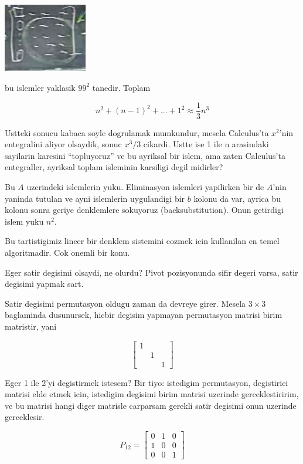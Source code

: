 \documentclass[12pt,fleqn]{article}\usepackage{../common}
\begin{document}
\includegraphics[height=3cm]{02.png}

bu islemler yaklasik $99^2$ tanedir. Toplam

\[ n^2 + (n-1)^2 + ... + 1^2 \approx \frac{ 1}{3} n^3 \]

Ustteki sonucu kabaca soyle dogrulamak mumkundur, mesela Calculus'ta
$x^2$'nin entegralini aliyor olsaydik, sonuc $x^3/3$
cikardi. Ustte ise 1 ile n arasindaki sayilarin karesini ``topluyoruz'' ve
bu ayriksal bir islem, ama zaten Calculus'ta entegraller, ayriksal toplam
isleminin karsiligi degil midirler? 

Bu $A$ uzerindeki islemlerin yuku. Eliminasyon islemleri yapilirken bir de
$A$'nin yaninda tutulan ve ayni islemlerin uygulandigi bir $b$ kolonu da
var, ayrica bu kolonu sonra geriye denklemlere sokuyoruz
(backsubstitution). Onun getirdigi islem yuku $n^2$.

Bu tartistigimiz lineer bir denklem sistemini cozmek icin kullanilan en
temel algoritmadir. Cok onemli bir konu. 

Eger satir degisimi olsaydi, ne olurdu? Pivot pozisyonunda sifir degeri
varsa, satir degisimi yapmak sart. 

Satir degisimi permutasyon oldugu zaman da devreye girer. Mesela $3 \times
3$ baglaminda dusunursek, hicbir degisim yapmayan permutasyon matrisi birim
matristir, yani 

\[ 
\left[\begin{array}{rrr}
1 && \\
 & 1 & \\
 && 1
\end{array}\right]
 \]

Eger 1 ile 2'yi degistirmek istesem? Bir tiyo: istedigim permutasyon,
degistirici matrisi elde etmek icin, istedigim degisimi birim
matrisi uzerinde gerceklestiririm, ve bu matrisi hangi diger matrisle
carparsam gerekli satir degisimi onun uzerinde gerceklesir. 

\[ P_{12} = 
\left[\begin{array}{rrr}
0 & 1 & 0\\
1 & 0 & 0 \\
0  & 0 & 1
\end{array}\right]
 \]
\end{document}
